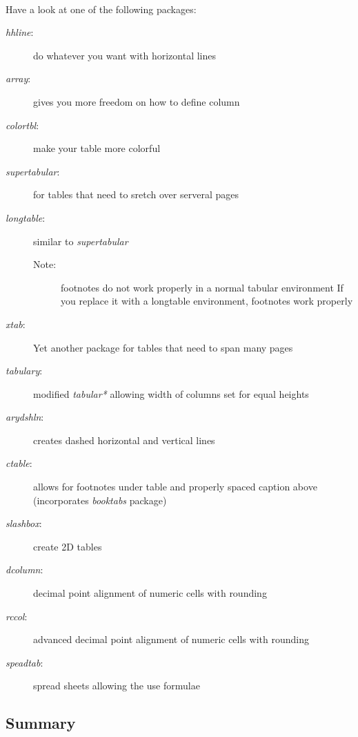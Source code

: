 \documentclass[11pt,a4paper]{article}
\begin{document}
\paragraph{}
Have a look at one of the following packages:
\begin{description}
	\item[\emph{hhline}:] do whatever you want with horizontal lines
	\item[\emph{array}:] gives you more freedom on how to define column
	\item[\emph{colortbl}:] make your table more colorful
	\item[\emph{supertabular}:] for tables that need to sretch over serveral pages
	\item[\emph{longtable}:] similar to \emph{supertabular} \hfill
		\begin{description}
			\item[Note:] footnotes do not work properly in a normal tabular environment
				If you replace it with a longtable environment, footnotes work properly
		\end{description}
	\item[\emph{xtab}:] Yet another package for tables that need to span many pages
	\item[\emph{tabulary}:] modified \emph{tabular*} allowing width of columns set for equal heights
	\item[\emph{arydshln}:] creates dashed horizontal and vertical lines
	\item[\emph{ctable}:] allows for footnotes under table and properly spaced caption above (incorporates \emph{booktabs} package)
	\item[\emph{slashbox}:] create 2D tables
	\item[\emph{dcolumn}:] decimal point alignment of numeric cells with rounding
	\item[\emph{rccol}:] advanced decimal point alignment of numeric cells with rounding
	\item[\emph{speadtab}:] spread sheets allowing the use formulae
\end{description}
\subsection{Summary}
\end{document}

